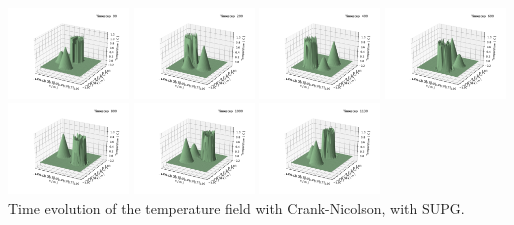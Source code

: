 \begin{center}
\includegraphics[width=3.2cm]{python_codes/fieldstone_43/results/experiment2/supg/solution_0000.pdf}
\includegraphics[width=3.2cm]{python_codes/fieldstone_43/results/experiment2/supg/solution_0200.pdf}
\includegraphics[width=3.2cm]{python_codes/fieldstone_43/results/experiment2/supg/solution_0400.pdf}
\includegraphics[width=3.2cm]{python_codes/fieldstone_43/results/experiment2/supg/solution_0600.pdf}\\
\includegraphics[width=3.2cm]{python_codes/fieldstone_43/results/experiment2/supg/solution_0800.pdf}
\includegraphics[width=3.2cm]{python_codes/fieldstone_43/results/experiment2/supg/solution_1000.pdf}
\includegraphics[width=3.2cm]{python_codes/fieldstone_43/results/experiment2/supg/solution_1130.pdf}\\
{\small Time evolution of the temperature field with Crank-Nicolson, with SUPG.}
\end{center}


